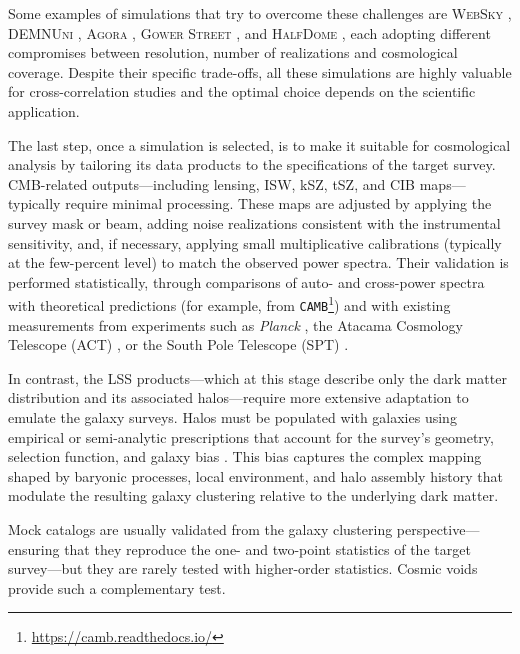 \documentclass[]{aa} %
\begin{document}
Some examples of simulations that try to overcome these challenges are \textsc{WebSky} \citep{Websky2020}, \textsc{DEMNUni} \citep{DEMNUni2015Jcastorina,DEMNUni2016carbone}, \textsc{Agora} \citep{omori2022}, \textsc{Gower Street} \citep{gowerstreet2025}, and \textsc{HalfDome} \citep{halfdome2025}, each adopting different compromises between resolution, number of realizations and cosmological coverage. Despite their specific trade-offs, all these simulations are highly valuable for cross-correlation studies and the optimal choice depends on the scientific application.

The last step, once a simulation is selected, is to make it suitable for cosmological analysis by tailoring its data products to the specifications of the target survey. CMB-related outputs---including lensing, ISW, kSZ, tSZ, and CIB maps---typically require minimal processing. These maps are adjusted by applying the survey mask or beam, adding noise realizations consistent with the instrumental sensitivity, and, if necessary, applying small multiplicative calibrations (typically at the few-percent level) to match the observed power spectra. Their validation is performed statistically, through comparisons of auto- and cross-power spectra with theoretical predictions (for example, from \texttt{CAMB}\footnote{\hyperlink{https://camb.readthedocs.io/}{https://camb.readthedocs.io/}}) and with existing measurements from experiments such as \emph{Planck} \citep{Planck2014_survey,Planck2016_survey,Planck2020_survey}, the Atacama Cosmology Telescope (ACT) \citep{ACT2011_survey,ACT2017_survey} , or the South Pole Telescope (SPT) \citep{SPT2015_survey,SPT2019_survey}.

In contrast, the LSS products---which at this stage describe only the dark matter distribution and its associated halos---require more extensive adaptation to emulate the galaxy surveys. Halos must be populated with galaxies using empirical or semi-analytic prescriptions that account for the survey’s geometry, selection function, and galaxy bias \citep{somerville2014,wechsler&tinker2018}. This bias captures the complex mapping shaped by baryonic processes, local environment, and halo assembly history that modulate the resulting galaxy clustering relative to the underlying dark matter. 

Mock catalogs are usually validated from the galaxy clustering perspective---ensuring that they reproduce the one- and two-point statistics of the target survey---but they are rarely tested with higher-order statistics. Cosmic voids provide such a complementary test.
\end{document}
